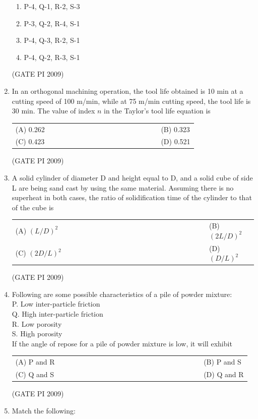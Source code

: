 \documentclass[journal,12pt,onecolumn]{IEEEtran}
\theoremstyle{remark}
\begin{document}
\begin{enumerate}[label=Q.\arabic*, leftmargin=*]
\begin{multicols}{2}
\begin{enumerate}[label=(\Alph*)]
    \item P-4, Q-1, R-2, S-3
    \item P-3, Q-2, R-4, S-1
    \item P-4, Q-3, R-2, S-1
    \item P-4, Q-2, R-3, S-1
\end{enumerate}
\end{multicols}
\hfill (GATE PI 2009)
\item In an orthogonal machining operation, the tool life obtained is 10 min at a cutting speed of 100 m/min, while at 75 m/min cutting speed, the tool life is 30 min. The value of index $n$ in the Taylor's tool life equation is
\begin{multicols}{2}
\begin{tabular}[t]{p{0.8\linewidth} p{0.9\linewidth}}
(A) 0.262 & (B) 0.323 \\
(C) 0.423 & (D) 0.521 \\
\end{tabular}
\end{multicols}
\hfill (GATE PI 2009)
\item A solid cylinder of diameter D and height equal to D, and a solid cube of side L are being sand cast by using the same material. Assuming there is no superheat in both cases, the ratio of solidification time of the cylinder to that of the cube is
\begin{multicols}{2}
\begin{tabular}[t]{p{0.8\linewidth} p{0.9\linewidth}}
(A) $(L/D)^2$& (B) $(2L/D)^2$ \\
(C) $(2D/L)^2$& (D) $(D/L)^2$ \\
\end{tabular}
\end{multicols}
\hfill (GATE PI 2009)
\item Following are some possible characteristics of a pile of powder mixture: \\
P. Low inter-particle friction \\
Q. High inter-particle friction \\
R. Low porosity \\
S. High porosity \\
If the angle of repose for a pile of powder mixture is low, it will exhibit
\begin{multicols}{2}
\begin{tabular}[t]{p{0.8\linewidth} p{0.9\linewidth}}
(A) P and R & (B) P and S \\
(C) Q and S & (D) Q and R \\
\end{tabular}
\end{multicols}
\hfill (GATE PI 2009)
\item Match the following:


\end{enumerate}
\end{document}
